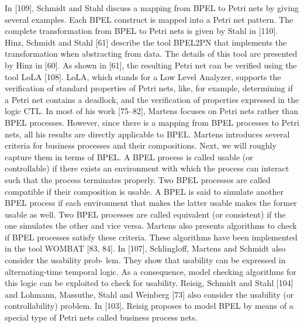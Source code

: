 In [109], Schmidt and Stahl discuss a mapping from BPEL to Petri nets by giving
several examples. Each BPEL construct is mapped into a Petri net pattern. The
complete transformation from BPEL to Petri nets is given by Stahl in [110].
Hinz, Schmidt and Stahl [61] describe the tool BPEL2PN that implements the
transformation when abstracting from data. The details of this tool are presented
by Hinz in [60]. As shown in [61], the resulting Petri net can be verified using
the tool LoLA [108]. LoLA, which stands for a Low Level Analyzer, supports the
verification of standard properties of Petri nets, like, for example, determining
if a Petri net contains a deadlock, and the verification of properties expressed in
the logic CTL.
In most of his work [75–82], Martens focuses on Petri nets rather than BPEL
processes. However, since there is a mapping from BPEL processes to Petri nets,
all his results are directly applicable to BPEL. Martens introduces several criteria
for business processes and their compositions. Next, we will roughly capture
them in terms of BPEL. A BPEL process is called usable (or controllable) if
there exists an environment with which the process can interact such that the
process terminates properly. Two BPEL processes are called compatible if their
composition is usable. A BPEL is said to simulate another BPEL process if
each environment that makes the latter usable makes the former usable as well.
Two BPEL processes are called equivalent (or consistent) if the one simulates
the other and vice versa. Martens also presents algorithms to check if BPEL
processes satisfy these criteria. These algorithms have been implemented in the
tool WOMBAT [83, 84].
In [107], Schlingloff, Martens and Schmidt also consider the usability prob-
lem. They show that usability can be expressed in alternating-time temporal
logic. As a consequence, model checking algorithms for this logic can be exploited
to check for usability. Reisig, Schmidt and Stahl [104] and Lohmann, Massuthe,
Stahl and Weinberg [73] also consider the usability (or controllability) problem.
In [103], Reisig proposes to model BPEL by means of a special type of Petri
nets called business process nets.
 

